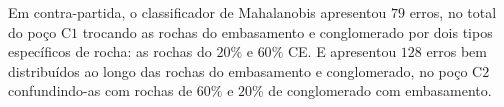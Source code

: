 Em contra-partida, o classificador de Mahalanobis apresentou $79$ erros, no total do poço C$1$ trocando as rochas do embasamento e conglomerado por dois tipos específicos de rocha: as rochas do $20\%$ e $60\%$ CE. E apresentou $128$ erros bem distribuídos ao longo das rochas do embasamento e conglomerado, no poço C$2$ confundindo-as com rochas de $60\%$ e $20\%$ de conglomerado com embasamento. 





